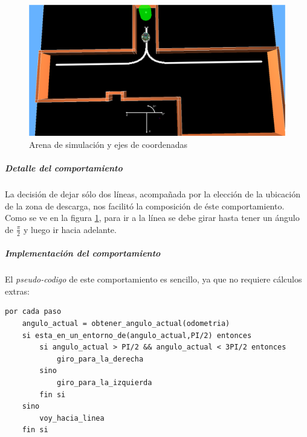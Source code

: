 \begin{figure}[htp]
\begin{center}
\includegraphics[scale=0.3]{comportamientos/arenafinal.png}
\caption{Arena de simulaci\'on y ejes de coordenadas}
\label{fig:arenafinal}
\end{center}
\end{figure}

\subparagraph{Detalle del comportamiento}
La decisi\'on de dejar s\'olo dos l\'ineas, acompa\~nada por la elecci\'on de la ubicaci\'on de la
zona de descarga, nos facilit\'o la composici\'on de \'este comportamiento.
\\ Como se ve en la figura \ref{fig:arenafinal}, para ir a la l\'inea se debe girar hasta tener
un \'angulo de $\frac{\pi}{2}$ y luego ir hacia adelante.


\subparagraph{Implementaci\'on del comportamiento}
El \emph{pseudo-codigo} de este comportamiento es sencillo, ya que
no requiere c\'alculos extras:

\begin{verbatim}
por cada paso
    angulo_actual = obtener_angulo_actual(odometria)
    si esta_en_un_entorno_de(angulo_actual,PI/2) entonces
        si angulo_actual > PI/2 && angulo_actual < 3PI/2 entonces
            giro_para_la_derecha
        sino
            giro_para_la_izquierda
        fin si
    sino
        voy_hacia_linea
    fin si
\end{verbatim}

